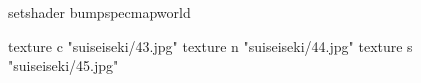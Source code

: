 setshader bumpspecmapworld

    texture c "suiseiseki/43.jpg"
    texture n "suiseiseki/44.jpg"
    texture s "suiseiseki/45.jpg"
